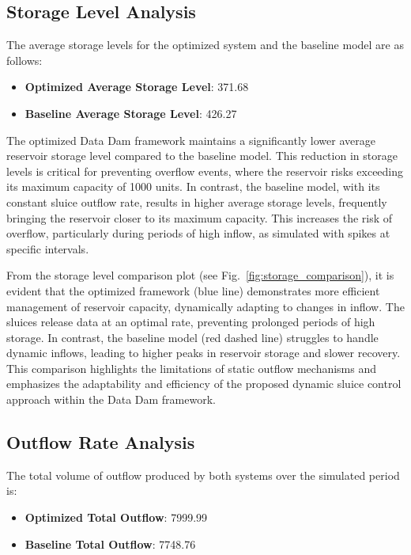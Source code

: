 \subsection{Storage Level Analysis}
The average storage levels for the optimized system and the baseline model are as follows:
\begin{itemize}
    \item \textbf{Optimized Average Storage Level}: 371.68
    \item \textbf{Baseline Average Storage Level}: 426.27
\end{itemize}

The optimized Data Dam framework maintains a significantly lower average reservoir storage level compared to the baseline model. This reduction in storage levels is critical for preventing overflow events, where the reservoir risks exceeding its maximum capacity of 1000 units. In contrast, the baseline model, with its constant sluice outflow rate, results in higher average storage levels, frequently bringing the reservoir closer to its maximum capacity. This increases the risk of overflow, particularly during periods of high inflow, as simulated with spikes at specific intervals.

From the storage level comparison plot (see Fig.~\ref{fig:storage_comparison}), it is evident that the optimized framework (blue line) demonstrates more efficient management of reservoir capacity, dynamically adapting to changes in inflow. The sluices release data at an optimal rate, preventing prolonged periods of high storage. In contrast, the baseline model (red dashed line) struggles to handle dynamic inflows, leading to higher peaks in reservoir storage and slower recovery. This comparison highlights the limitations of static outflow mechanisms and emphasizes the adaptability and efficiency of the proposed dynamic sluice control approach within the Data Dam framework.


\subsection{Outflow Rate Analysis}

The total volume of outflow produced by both systems over the simulated period is:
\begin{itemize}
    \item \textbf{Optimized Total Outflow}: 7999.99
    \item \textbf{Baseline Total Outflow}: 7748.76
\end{itemize}

